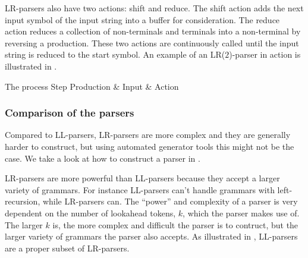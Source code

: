 LR-parsers also have two actions: shift and reduce. The shift action
adds the next input symbol of the input string into a buffer for
consideration. The reduce action reduces a collection of non-terminals
and terminals into a non-terminal by reversing a production. These
two actions are continuously called until the input string is reduced
to the start symbol. \cite{LL(1)andLR(2)inaction} An example of an
LR($2$)-parser in action is illustrated in .

	  {The process	    					 }
{Step  	 }{Production & Input       & Action                     }{
}

\subsubsection{Comparison of the parsers}
Compared to LL-parsers, LR-parsers are more complex and they are
generally harder to construct\cite[p. 193]{sebesta2013}, but using
automated generator tools this might not be the case. We take a look at
how to construct a parser in .

LR-parsers are more powerful than LL-parsers because they accept a
larger variety of grammars. For instance LL-parsers can't handle grammars with
left-recursion, while LR-parsers can. The ``power'' and complexity of a parser
is very dependent on the number of lookahead tokens, $k$, which the parser makes
use of. The larger $k$ is, the more complex and difficult the parser is to
contruct, but the larger variety of grammars the parser also accepts. As
illustrated in , LL-parsers are a proper
subset of LR-parsers.


